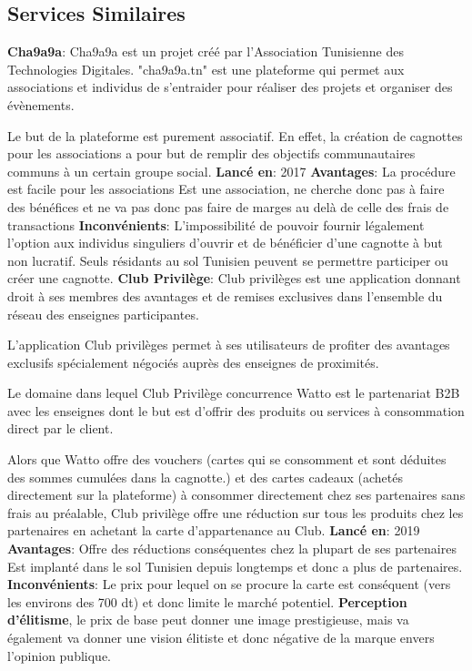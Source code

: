 \documentclass[../main.tex]{subfiles}
\begin{document}
\subsection{Services Similaires}
\begin{outline}
 \1 \textbf{Cha9a9a}: Cha9a9a est un projet créé par l'Association Tunisienne des Technologies Digitales. "cha9a9a.tn" est une plateforme qui permet aux associations et individus de s'entraider pour réaliser des projets et organiser des évènements.

Le but de la plateforme est purement associatif. En effet, la création de cagnottes pour les associations a pour but de remplir des objectifs communautaires communs à un certain groupe social.
    \2 \textbf{Lancé en}: 2017
    \2 \textbf{Avantages}:
        \3 La procédure est facile pour les associations
        \3 Est une association, ne cherche donc pas à faire des bénéfices et ne va pas donc pas faire de marges au delà de celle des frais de transactions
    \2 \textbf{Inconvénients}:
        \3 L'impossibilité de pouvoir fournir légalement l'option aux individus singuliers d'ouvrir et de bénéficier d'une cagnotte à but non lucratif. 
        \3 Seuls résidants au sol Tunisien peuvent se permettre participer ou créer une cagnotte. 
 \1 \textbf{Club Privilège}: Club privilèges est une application donnant droit à ses membres des avantages et de remises exclusives dans l’ensemble du réseau des enseignes participantes.

L’application Club privilèges  permet à ses utilisateurs de profiter des avantages exclusifs spécialement négociés auprès des enseignes de proximités.\cite{clubprivilege}

Le domaine dans lequel Club Privilège concurrence Watto est le partenariat B2B avec les enseignes dont le but est d'offrir des  produits ou services à consommation direct par le client. 

Alors que Watto offre des vouchers (cartes qui se consomment et sont déduites des sommes cumulées dans la cagnotte.) et des cartes cadeaux (achetés directement sur la plateforme) à consommer directement chez ses partenaires sans frais au préalable, Club privilège offre une réduction sur tous les produits chez les partenaires en achetant la carte d'appartenance au Club. 
    \2 \textbf{Lancé en}: 2019
    \2 \textbf{Avantages}:
        \3 Offre des réductions conséquentes chez la plupart de ses partenaires
        \3 Est implanté dans le sol Tunisien depuis longtemps et donc a plus de partenaires. 
    \2 \textbf{Inconvénients}:
        \3 Le prix pour lequel on se procure la carte est conséquent (vers les environs des 700 dt) et donc limite le marché potentiel.
        \3 \textbf{Perception d'élitisme}, le prix de base peut donner une image prestigieuse, mais va également va donner une vision élitiste et donc négative de la marque envers l'opinion publique.  
\end{outline}
\end{document}
